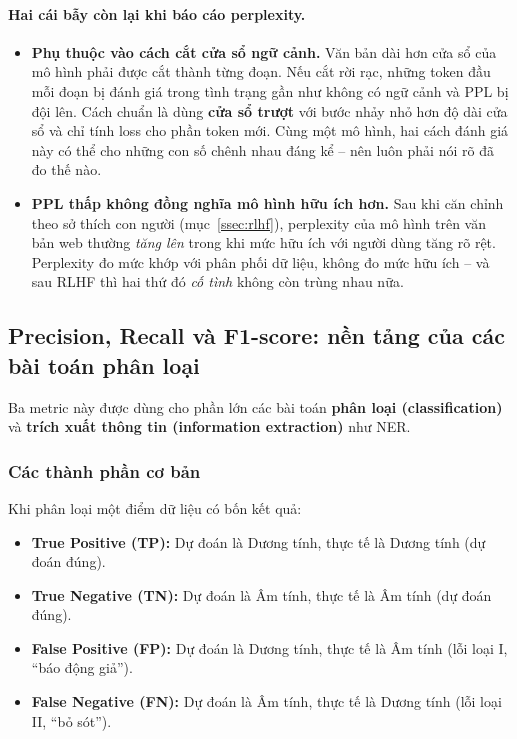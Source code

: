 \paragraph{Hai cái bẫy còn lại khi báo cáo perplexity.}
\begin{itemize}
    \item \textbf{Phụ thuộc vào cách cắt cửa sổ ngữ cảnh.} Văn bản dài hơn cửa sổ của mô hình phải được cắt thành từng đoạn. Nếu cắt rời rạc, những token đầu mỗi đoạn bị đánh giá trong tình trạng gần như không có ngữ cảnh và PPL bị đội lên. Cách chuẩn là dùng \textbf{cửa sổ trượt} với bước nhảy nhỏ hơn độ dài cửa sổ và chỉ tính loss cho phần token mới. Cùng một mô hình, hai cách đánh giá này có thể cho những con số chênh nhau đáng kể -- nên luôn phải nói rõ đã đo thế nào.
    \item \textbf{PPL thấp không đồng nghĩa mô hình hữu ích hơn.} Sau khi căn chỉnh theo sở thích con người (mục~\ref{ssec:rlhf}), perplexity của mô hình trên văn bản web thường \emph{tăng lên} trong khi mức hữu ích với người dùng tăng rõ rệt. Perplexity đo mức khớp với phân phối dữ liệu, không đo mức hữu ích -- và sau RLHF thì hai thứ đó \emph{cố tình} không còn trùng nhau nữa.
\end{itemize}

\subsection{Precision, Recall và F1-score: nền tảng của các bài toán phân loại}
\label{ssec:f1_score}
Ba metric này được dùng cho phần lớn các bài toán \textbf{phân loại (classification)} và \textbf{trích xuất thông tin (information extraction)} như NER.

\subsubsection{Các thành phần cơ bản}
Khi phân loại một điểm dữ liệu có bốn kết quả:
\begin{itemize}
    \item \textbf{True Positive (TP):} Dự đoán là Dương tính, thực tế là Dương tính (dự đoán đúng).
    \item \textbf{True Negative (TN):} Dự đoán là Âm tính, thực tế là Âm tính (dự đoán đúng).
    \item \textbf{False Positive (FP):} Dự đoán là Dương tính, thực tế là Âm tính (lỗi loại I, “báo động giả”).
    \item \textbf{False Negative (FN):} Dự đoán là Âm tính, thực tế là Dương tính (lỗi loại II, “bỏ sót”).
\end{itemize}

